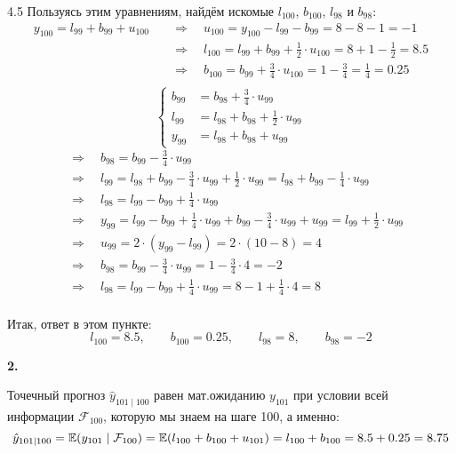 \begin{solution}{{4.5}}
Пользуясь этим уравнениям, найдём искомые $l_{100}$, $b_{100}$, $l_{98}$ и $b_{98}$:
\begin{align*}
    y_{100} = l_{99} + b_{99} + u_{100} \quad &\Rightarrow \quad u_{100} = y_{100} - l_{99} - b_{99} = 8 - 8 - 1 = -1 \\
    &\Rightarrow \quad l_{100} = l_{99} + b_{99} + \frac{1}{2} \cdot u_{100} = 8 + 1 - \frac{1}{2} = 8.5 \\
    &\Rightarrow \quad b_{100} = b_{99} + \frac{3}{4} \cdot u_{100} = 1 - \frac{3}{4} = \frac{1}{4} = 0.25\\
\end{align*}
\[
    \left\{\begin{aligned}
        b_{99} &= b_{98} + \frac{3}{4} \cdot u_{99} \\
        l_{99} &= l_{98} + b_{98} + \frac{1}{2} \cdot u_{99} \\
        y_{99} &= l_{98} + b_{98} + u_{99}
    \end{aligned}\right.
\]
\begin{align*}
    &\Rightarrow \quad b_{98} = b_{99} - \frac{3}{4} \cdot u_{99} \\
    &\Rightarrow \quad l_{99} = l_{98} + b_{99} - \frac{3}{4} \cdot u_{99} + \frac{1}{2} \cdot u_{99} =  l_{98} + b_{99} - \frac{1}{4} \cdot u_{99} \\
    &\Rightarrow \quad l_{98} = l_{99} - b_{99} + \frac{1}{4} \cdot u_{99} \\
    &\Rightarrow \quad y_{99} = l_{99} - b_{99} + \frac{1}{4} \cdot u_{99} + b_{99} - \frac{3}{4} \cdot u_{99} + u_{99} = l_{99} + \frac{1}{2} \cdot u_{99} \\
    &\Rightarrow \quad u_{99} = 2 \cdot (y_{99} - l_{99}) = 2 \cdot (10 - 8) = 4 \\
    &\Rightarrow \quad b_{98} = b_{99} - \frac{3}{4} \cdot u_{99} = 1 - \frac{3}{4} \cdot 4 = -2 \\
    &\Rightarrow \quad l_{98} = l_{99} - b_{99} + \frac{1}{4} \cdot u_{99} = 8 - 1 + \frac{1}{4} \cdot 4 = 8\\
\end{align*}

Итак, ответ в этом пункте:
\[
    l_{100} = 8.5, \qquad b_{100} = 0.25, \qquad l_{98} = 8, \qquad b_{98} = -2
\]

\textbf{2.}

Точечный прогноз $\hat{y}_{101 \mid 100}$ равен мат.ожиданию $y_{101}$ при условии всей информации $\mathcal{F}_{100}$, которую мы знаем на шаге 100, а именно:
\[
    \hat{y}_{101 \mid 100} = \mathbb{E}{\left(y_{101} \mid \mathcal{F}_{100}\right)} = \mathbb{E}{\left(l_{100} + b_{100} + u_{101}\right)} = l_{100} + b_{100} = 8.5 + 0.25 = 8.75
\]


\end{solution}
